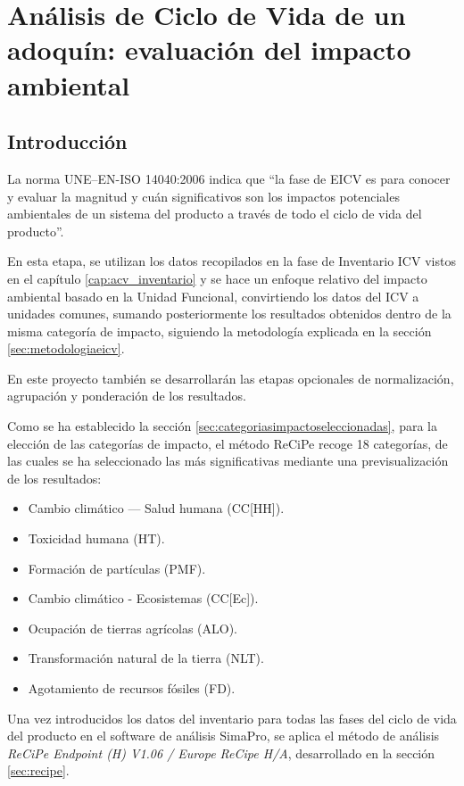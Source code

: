 \chapter{Análisis de Ciclo de Vida de un adoquín: evaluación del impacto ambiental}\label{cap:acv_evaluacion}

\section{Introducción}
La norma UNE–EN-ISO 14040:2006 \cite{iso14040} indica que ``la fase de EICV es para conocer y evaluar la magnitud y cuán significativos son los impactos potenciales ambientales de un sistema del producto a través de todo el ciclo de vida del producto''.

En esta etapa, se utilizan los datos recopilados en la fase de Inventario ICV vistos en el capítulo \ref{cap:acv_inventario} y se hace un enfoque relativo del impacto ambiental basado en la Unidad Funcional, convirtiendo los datos del ICV a unidades comunes, sumando posteriormente los resultados obtenidos dentro de la misma categoría de impacto, siguiendo la metodología explicada en la sección \ref{sec:metodologiaeicv}.

En este proyecto también se desarrollarán las etapas opcionales de normalización, agrupación y ponderación de los resultados.

Como se ha establecido la sección \ref{sec:categoriasimpactoseleccionadas}, para la elección de las categorías de impacto, el método ReCiPe recoge 18 categorías, de las cuales se ha seleccionado las más significativas mediante una previsualización de los resultados:
\begin{itemize}
  \item Cambio climático — Salud humana (CC[HH]).
  \item Toxicidad humana (HT).
  \item Formación de partículas (PMF).
  \item Cambio climático - Ecosistemas (CC[Ec]).
  \item Ocupación de tierras agrícolas (ALO).
  \item Transformación natural de la tierra (NLT).
  \item Agotamiento de recursos fósiles (FD).
\end{itemize}

Una vez introducidos los datos del inventario para todas las fases del ciclo de vida del producto en el software de análisis SimaPro, se aplica el método de análisis \textit{ReCiPe Endpoint (H) V1.06 / Europe ReCipe H/A}, desarrollado en la sección \ref{sec:recipe}.

